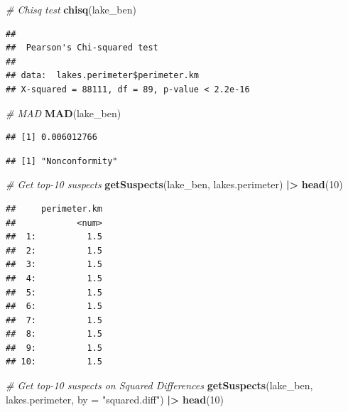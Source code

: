 \documentclass[
]{book}
\newenvironment{Shaded}{\begin{snugshade}}{\end{snugshade}}
\newcommand{\AttributeTok}[1]{\textcolor[rgb]{0.13,0.29,0.53}{#1}}
\newcommand{\CommentTok}[1]{\textcolor[rgb]{0.56,0.35,0.01}{\textit{#1}}}
\newcommand{\DecValTok}[1]{\textcolor[rgb]{0.00,0.00,0.81}{#1}}
\newcommand{\FunctionTok}[1]{\textcolor[rgb]{0.13,0.29,0.53}{\textbf{#1}}}
\newcommand{\NormalTok}[1]{#1}
\newcommand{\SpecialCharTok}[1]{\textcolor[rgb]{0.81,0.36,0.00}{\textbf{#1}}}
\newcommand{\StringTok}[1]{\textcolor[rgb]{0.31,0.60,0.02}{#1}}
\begin{document}
\begin{Shaded}
\begin{Highlighting}[]
\CommentTok{\# Chisq test}
\FunctionTok{chisq}\NormalTok{(lake\_ben)}
\end{Highlighting}
\end{Shaded}

\begin{verbatim}
## 
##  Pearson's Chi-squared test
## 
## data:  lakes.perimeter$perimeter.km
## X-squared = 88111, df = 89, p-value < 2.2e-16
\end{verbatim}

\begin{Shaded}
\begin{Highlighting}[]
\CommentTok{\# MAD}
\FunctionTok{MAD}\NormalTok{(lake\_ben)}
\end{Highlighting}
\end{Shaded}

\begin{verbatim}
## [1] 0.006012766
\end{verbatim}

\begin{Shaded}
\end{Shaded}

\begin{verbatim}
## [1] "Nonconformity"
\end{verbatim}

\begin{Shaded}
\begin{Highlighting}[]
\CommentTok{\# Get top{-}10 suspects}
\FunctionTok{getSuspects}\NormalTok{(lake\_ben, lakes.perimeter) }\SpecialCharTok{|\textgreater{}}
  \FunctionTok{head}\NormalTok{(}\DecValTok{10}\NormalTok{)}
\end{Highlighting}
\end{Shaded}

\begin{verbatim}
##     perimeter.km
##            <num>
##  1:          1.5
##  2:          1.5
##  3:          1.5
##  4:          1.5
##  5:          1.5
##  6:          1.5
##  7:          1.5
##  8:          1.5
##  9:          1.5
## 10:          1.5
\end{verbatim}

\begin{Shaded}
\begin{Highlighting}[]
\CommentTok{\# Get top{-}10 suspects on Squared Differences}
\FunctionTok{getSuspects}\NormalTok{(lake\_ben, lakes.perimeter, }
            \AttributeTok{by =} \StringTok{"squared.diff"}\NormalTok{) }\SpecialCharTok{|\textgreater{}}
  \FunctionTok{head}\NormalTok{(}\DecValTok{10}\NormalTok{)}
\end{Highlighting}
\end{Shaded}
\end{document}
